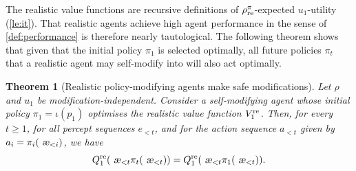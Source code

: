 \documentclass[a4paper]{article}
\newtheorem{theorem}{Theorem}
\theoremstyle{definition}
\theoremstyle{remark}
\let\aechar\ae %
\renewcommand{\ae}{
\ifmmode\mathchoice{
	\mbox{\textsl{\aechar}}
}{
	\mbox{\textsl{\aechar}}
}{
	\mbox{\scriptsize\textsl{\aechar}}
}{
	\mbox{\scriptsize\textsl{\aechar}}
}\else\aechar\fi%
}                         %
\newcommand*{\Qre}[1][]{Q^{{\rm re} #1}}
\newcommand*{\Vre}[1][]{V^{{\rm re} #1}}
\newcommand*{\rhore}[1][]{\rho_{{\rm re} #1}}
\begin{document}
The realistic value functions are recursive definitions of
$\rhore^\pi$-expected $u_1$-utility
(\cref{le:it}).
That realistic agents achieve high agent performance in the sense
of \cref{def:performance} is therefore nearly tautological.
The following theorem shows that given that the initial policy $\pi_1$
is selected optimally, all future policies $\pi_t$ that a realistic agent
may self-modify into will also act optimally.

\begin{theorem}[Realistic policy-modifying agents make safe modifications]
  \label{th:safe-mod}
  \label{th:re-good}
  Let $\rho$ and $u_1$ be modification-independent.
  Consider a self-modifying agent whose initial policy $\pi_1=\iota(p_1)$
  optimises the realistic value function $\Vre_1$.
  Then, for every $t \geq 1$, for all percept sequences $e_{<t}$,
  and for the action sequence $a_{<t}$ given by $a_i = \pi_{i}(\ae_{<i})$, we have
  \begin{equation}
    \Qre_1(\ae_{<t}\pi_t(\ae_{<t})) = \Qre_1(\ae_{<t} \pi_1(\ae_{<t})). \label{eq:safe-mod}
  \end{equation}
\end{theorem}
\end{document}
